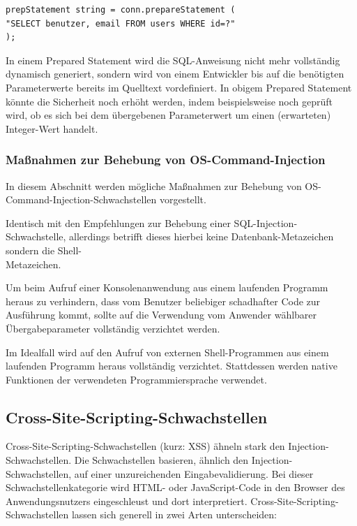 \begin{lstlisting}[basicstyle=\ttfamily\footnotesize]
prepStatement string = conn.prepareStatement (
"SELECT benutzer, email FROM users WHERE id=?"
);
\end{lstlisting}

In einem Prepared Statement wird die SQL-Anweisung nicht mehr 
vollständig dynamisch generiert, sondern wird von einem Entwickler 
bis auf die benötigten Parameterwerte bereits im Quelltext vordefiniert. 
In obigem Prepared Statement könnte die Sicherheit noch erhöht werden, 
indem beispielsweise noch geprüft wird, ob es sich bei dem übergebenen 
Parameterwert um einen (erwarteten) Integer-Wert handelt.

\subsubsection{Maßnahmen zur Behebung von OS-Command-Injection}

In diesem Abschnitt werden mögliche Maßnahmen zur Behebung von 
OS-Command-Injection-Schwachstellen vorgestellt.


Identisch mit den Empfehlungen zur Behebung einer SQL-Injection-Schwachstelle, 
allerdings betrifft dieses hierbei keine Datenbank-Metazeichen sondern die 
Shell-\\Metazeichen.

\newpage
{}

Um beim Aufruf einer Konsolenanwendung aus einem laufenden Programm 
heraus zu verhindern, dass vom Benutzer beliebiger schadhafter Code zur 
Ausführung kommt, sollte auf die Verwendung vom Anwender wählbarer 
Übergabeparameter vollständig verzichtet werden.


Im Idealfall wird auf den Aufruf von externen Shell-Programmen aus einem 
laufenden Programm heraus vollständig verzichtet. Stattdessen werden 
native Funktionen der verwendeten Programmiersprache verwendet.


\subsection{Cross-Site-Scripting-Schwachstellen}

Cross-Site-Scripting-Schwachstellen (kurz: XSS) ähneln stark den 
Injection-Schwachstellen. Die Schwachstellen basieren, ähnlich den 
Injection-Schwachstellen, auf einer unzureichenden Eingabevalidierung. 
Bei dieser Schwachstellenkategorie wird HTML- oder JavaScript-Code in den 
Browser des Anwendungsnutzers eingeschleust und dort interpretiert. 
Cross-Site-Scripting-Schwachstellen lassen sich generell in zwei 
Arten unterscheiden:


